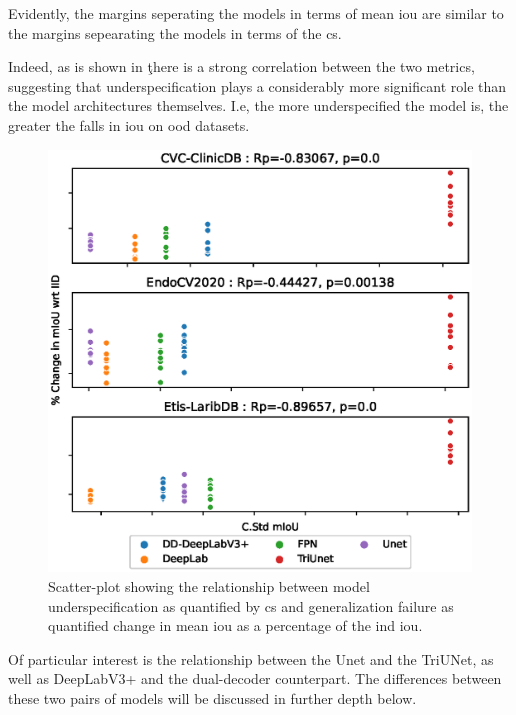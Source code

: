     Evidently, the margins seperating the models in terms of  mean \gls{iou} are similar to the margins sepearating the models in terms of the \gls{cs}. 
    
    Indeed, as is shown in \c there is a strong correlation between the two metrics, suggesting that underspecification plays a considerably more significant role than the model architectures themselves. I.e, the more underspecified the model is, the greater the falls in \gls{iou} on \gls{ood} datasets. 
    
    \begin{figure}[htb]
        \centering
        \includegraphics{illustrations/underspecification_baseline.eps}
        \caption[Correlation between Generalizability and Underspecification]{Scatter-plot showing the relationship between model underspecification as quantified by \gls{cs} and generalization failure as quantified change in mean \gls{iou} as a percentage of the \gls{ind} \gls{iou}.}
        \label{fig:my_label}
    \end{figure}

    Of particular interest is the relationship between the Unet and the TriUNet, as well as DeepLabV3+ and the dual-decoder counterpart. The differences between these two pairs of models will be discussed in further depth below.
    
